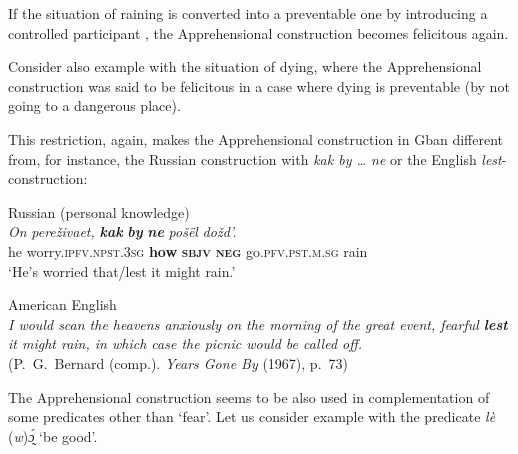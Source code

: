 \documentclass[output=paper,colorlinks,citecolor=brown
]{langscibook}
\begin{document}
 If the situation of raining is converted into a preventable one by introducing a controlled participant , the Apprehensional construction becomes felicitous again.

\z

 Consider also example  with the situation of dying, where the Apprehensional construction was said to be felicitous in a case where dying is preventable (by not going to a dangerous place).

This restriction, again, makes the Apprehensional construction in Gban different from, for instance, the Russian construction with \textit{kak by {\dots} ne} or the English \textit{lest}-construction:

\ea \label{ex:Fed50} \textnormal{Russian (personal knowledge)} \\
\gll \textit{On} \textit{pereživaet,} \textit{\textbf{kak}} \textit{\textbf{by}} \textit{\textbf{ne}} \textit{pošël} \textit{dožd'.} \\
he worry.\textsc{ipfv.npst.3sg} \textbf{how} \textsc{\textbf{sbjv}} \textsc{\textbf{neg}} go.\textsc{pfv.pst.m.sg} rain \\
\glt `He's worried that\slash lest it might rain.'
\z


\ea \label{ex:Fed51} \textnormal{American English} \\
\textit{I would scan the heavens anxiously on the morning of the great event, fearful \textbf{lest} it might rain, in which case the picnic would be called off.} \\
\textup{(P.\ G.\ Bernard (comp.). \textit{Years Gone By} (1967), p.\ 73)}
\z


 The Apprehensional construction seems to be also used in complementation of some predicates other than `fear'. Let us consider example  with the predicate \textit{lè }(\textit{w})\textit{ɔ̰́} `be good'.
\end{document}
